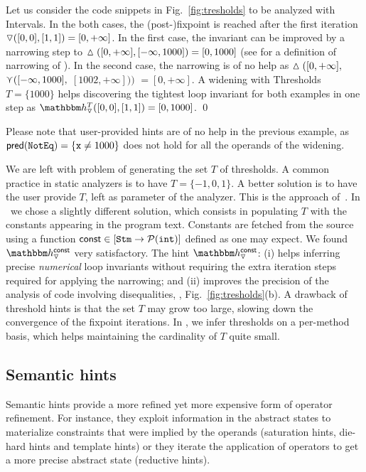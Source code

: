 \documentclass[sttt]{svjour}
\begin{document}
\begin{example}
Let us consider the code snippets in Fig.~\ref{fig:tresholds} to be analyzed with Intervals.
In the both cases, the (post-)fixpoint is reached after the first iteration $\triangledown([0,0],  [1,1]) = [0, +\infty]$.
In the first case, the invariant can be improved by a narrowing step to $ \vartriangle([0, +\infty], [-\infty, 1000])= [0, 1000]$ (see \cite{CousotCousot77} for a definition of narrowing of \Intervals).
In the second case, the narrowing is of no help as  $\vartriangle([0, +\infty], $ $\curlyvee([-\infty, 1000],$  $[1002, +\infty]))$ $= [0, +\infty]$.
A widening with Thresholds $T = \{ 1000 \}$ helps discovering the tightest loop invariant for both examples in one step as $\hint{\widening}^T([0,0],[1,1]) = [0, 1000]$.
\qed
\end{example}
Please note that user-provided hints are of no help in the previous example, as $\mathsf{pred}(\mathtt{NotEq}) = \{ \mathtt{x} \neq 1000\}$ does not hold for  all the operands of the widening. 

We are left with problem of generating the set $T$ of thresholds.
A common practice in static analyzers is to have $T = \{ -1, 0, 1\}$. 
A better solution is to have the user provide $T$, left  as parameter of the analyzer. 
This is the approach of~\cite{BlanchetCousotEtAl03}.
In \Clousot\ we chose a slightly different solution, which consists in populating $T$ with the constants appearing in the program text.
Constants are fetched from the source using a function $\mathsf{const} \in
[\mathtt{Stm} \rightarrow\mathcal{P}{(\mathtt{int})}]$ defined as one may expect.
We found $\hint{\widening}^{\mathsf{const}}$ very satisfactory.
The hint $\hint{\widening}^{\mathsf{const}}$: (i) helps inferring precise \emph{numerical} loop invariants  without requiring the extra iteration steps required for applying the narrowing; and (ii) improves the precision of the analysis of code involving disequalities, \eg, Fig.~\ref{fig:tresholds}(b).
A drawback of threshold hints is that the set $T$ may grow too large, slowing down the convergence of the fixpoint iterations.
In \Clousot, we infer thresholds on a per-method basis, which helps maintaining the cardinality of $T$ quite small.


\subsection{Semantic hints}
Semantic hints provide a more refined yet more expensive form of operator refinement.
For instance, they exploit information in the abstract states to materialize constraints that were implied by the operands (saturation hints, die-hard hints and template hints) or they iterate the application of operators to get a more precise abstract state (reductive hints).
\end{document}
